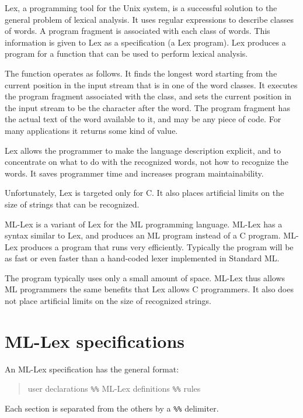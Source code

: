 \documentclass{article}
\begin{document}
Lex, a programming tool for the Unix system, is a successful solution
to the general problem of lexical analysis.  It uses regular
expressions to describe classes of words.  A program fragment is
associated with each class of words.  This information is given to
Lex as a specification (a Lex program).  Lex produces a program for a
function that can be used to perform lexical analysis.

The function operates as follows.  It finds the longest word starting
from the current position in the input stream that is in one of the
word classes.  It executes the program fragment associated with the
class, and sets the current position in the input stream to be the
character after the word.  The program fragment has the actual text
of the word available to it, and may be any piece of code.  For many
applications it returns some kind of value.

Lex allows the programmer to make the language description explicit,
and to concentrate on what to do with the recognized words, not how
to recognize the words.  It saves programmer time and increases
program maintainability.

Unfortunately, Lex is targeted only for C.  It also places artificial 
limits on the size of strings that can be recognized.

ML-Lex is a variant of Lex for the ML programming language.  ML-Lex
has a syntax similar to Lex, and produces an ML program instead of a
C program.  ML-Lex produces a program that runs very efficiently.
Typically the program will be as fast or even faster than a
hand-coded lexer implemented in Standard ML.

The program typically uses only a small amount of space.
ML-Lex thus allows ML programmers the same benefits that Lex allows C
programmers.  It also does not place artificial limits on the size of
recognized strings.

\section{ML-Lex specifications}

An ML-Lex specification has the general format:

\begin{quote}
        {user declarations}
        \verb|%%|
        {ML-Lex definitions}
        \verb|%%|
        {rules}
\end{quote}

Each section is separated from the others by a \verb|%%| delimiter.
\end{document}

